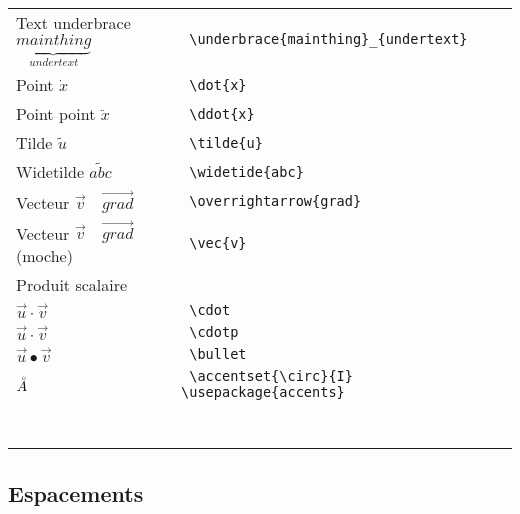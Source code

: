 \documentclass{report}
\begin{document}
\begin{tabular}{ll}
Text underbrace $ \underbrace{mainthing}_{undertext} $
&
\texttt{
\textbackslash{}underbrace\{mainthing\}\_\{undertext\}
}
\\

Point $ \dot{x} $
&
\texttt{
\textbackslash{}dot\{x\}
}
\\

Point point $ \ddot{x} $
&
\texttt{
\textbackslash{}ddot\{x\}
}
\\

Tilde $ \tilde{u} $
&
\texttt{
\textbackslash{}tilde\{u\}
}
\\


Widetilde $ \widetilde{abc} $
&
\texttt{
\textbackslash{}widetide\{abc\}
}
\\

Vecteur $ \overrightarrow{v} \quad \overrightarrow{grad} $ 
&
\texttt{
\textbackslash{}overrightarrow\{grad\}
}
\\

Vecteur $ \vec{v} \quad \vec{grad} $  (moche)
&
\texttt{
\textbackslash{}vec\{v\}
}
\\

Produit scalaire
&
\\

$ \overrightarrow{u} \cdot \overrightarrow{v} $
&
\texttt{
\textbackslash{}cdot
}
\\

$ \overrightarrow{u} \cdotp \overrightarrow{v} $
&
\texttt{
\textbackslash{}cdotp
}
\\

$ \overrightarrow{u} \bullet \overrightarrow{v} $
&
\texttt{
\textbackslash{}bullet
}
\\

$ \accentset{\circ}{A} $
&
\texttt{
\textbackslash{}accentset\{\textbackslash{}circ\}\{I\} \quad \textbackslash{}usepackage\{accents\}
}
\\




%
&
\texttt{
}
\\

%
&
\texttt{
}
\\

\end{tabular}



\subsection*{Espacements} %
\end{document}
